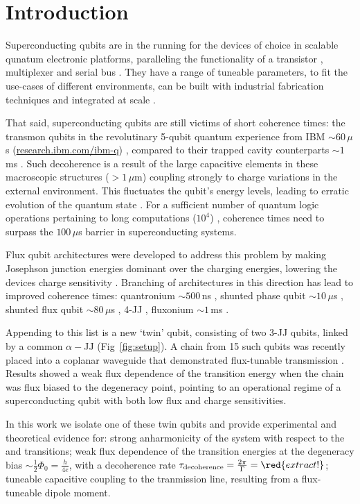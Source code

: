 \section{Introduction}
 \noindent Superconducting qubits are in the running for the devices of choice in scalable qunatum electronic platforms, paralleling the functionality of a transistor \cite{Astafiev2010}\cite{hoi2011}, multiplexer \cite{honigl2018} and serial bus \cite{shen2005}. They have a range of tuneable parameters, to fit the use-cases of different environments, can be built with industrial fabrication techniques and integrated at scale \cite{johnson2010}. 
 
 That said, superconducting qubits are still victims of short coherence times: the transmon qubits in the revolutinary 5-qubit quantum experience from IBM $ \sim 60\,\mu $s (\href{http://www.research.ibm.com/ibm-q}{research.ibm.com/ibm-q}) \cite{linke2017}, compared to their trapped cavity counterparts $\sim1\, $ms \cite{monroe1995}. Such decoherence is a result of the large capacitive elements in these macroscopic structures ($>1\,\mu\text{m}$) coupling strongly to charge variations in the external environment. This fluctuates the qubit's energy levels, leading to erratic evolution of the quantum state \cite{devoret2008}. For a sufficient number of quantum logic operations pertaining to long computations ($ 10^{4} $) \cite{orlando1999}, coherence times need to surpass the $ 100\,\mu$s barrier in superconducting systems.
 
 Flux qubit architectures \cite{chiorescu2003}\cite{mooij1999} were developed to address this problem by making Josephson junction energies dominant over the charging energies, lowering the devices charge sensitivity \cite{orlando1999}. Branching of architectures in this direction has lead to improved coherence times: quantronium $\sim500\,$ns \cite{cottet2002} \cite{gu2017}, shunted phase qubit $\sim10\,\mu $s \cite{stern2014} , shunted flux qubit $\sim80\,\mu$s \cite{yan2016} , 4-JJ \cite{qui2016}, fluxonium $\sim1\,$ms \cite{pop2014}. 
 
 Appending to this list is a new `twin' qubit, consisting of two 3-JJ qubits, linked by a common $ \alpha-$JJ (Fig~\ref{fig:setup}). A chain from 15 such qubits was recently placed into a coplanar waveguide that demonstrated flux-tunable transmission \cite{shulga2018}. Results showed a weak flux dependence of the transition energy when the chain was flux biased to the degeneracy point, pointing to an operational regime of a superconducting qubit with both low flux and charge sensitivities.
 
 In this work we isolate one of these twin qubits and provide experimental and theoretical evidence for: strong anharmonicity of the system with respect to the \lra{} and \lra{} transitions; weak flux dependence of the transition energies at the degeneracy bias $\sim \frac{1}{2}\Phi_0 = \frac{h}{4e}$, with a decoherence rate $ \tau_\text{decoherence} = \frac{2\pi}{\Gamma}= \red{extract!} $; tuneable capacitive coupling to the tranmission line, resulting from a flux-tuneable dipole moment.
 